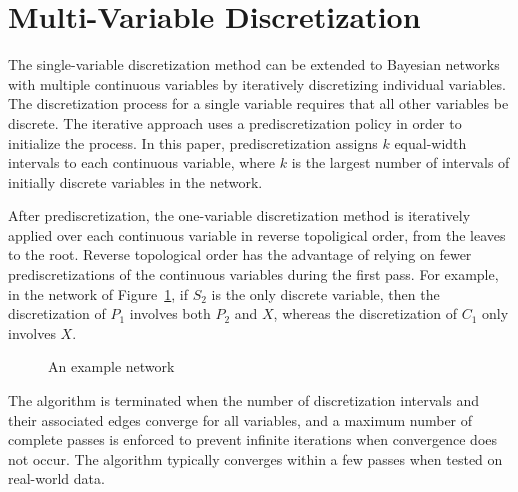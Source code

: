 %     
%     


\section{Multi-Variable Discretization}
\label{sec:multi_var}

The single-variable discretization method can be extended to Bayesian networks with multiple continuous variables by iteratively discretizing individual variables.
The discretization process for a single variable requires that all other variables be discrete.
The iterative approach uses a prediscretization policy in order to initialize the process.
In this paper, prediscretization assigns $k$ equal-width intervals to each continuous variable, where $k$ is the largest number of intervals of initially discrete variables in the network.

After prediscretization, the one-variable discretization method is iteratively applied over each continuous variable in reverse topoligical order, from the leaves to the root.
Reverse topological order has the advantage of relying on fewer prediscretizations of the continuous variables during the first pass.
For example, in the network of Figure~\ref{fig:example_networks}, if $S_2$ is the only discrete variable, then the discretization of $P_1$ involves both $P_2$ and $X$, whereas the discretization of $C_1$ only involves $X$.

\begin{figure}[ht]
 \centering
     
  \caption{An example network}
   \label{fig:example_networks}
\end{figure}

The algorithm is terminated when the number of discretization intervals and their associated edges converge for all variables, and a maximum number of complete passes is enforced to prevent infinite iterations when convergence does not occur.
The algorithm typically converges within a few passes when tested on real-world data.

